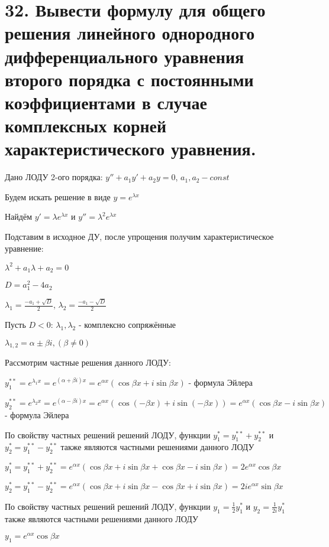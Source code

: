 \documentclass[11pt]{article}
\begin{document}
\section*{32. Вывести формулу для общего решения линейного однородного дифференциального уравнения второго порядка с постоянными коэффициентами в случае комплексных корней характеристического уравнения.}
\par Дано ЛОДУ 2-ого порядка: $y'' + a_{1}y' + a_{2}y = 0$, $a_{1}, a_{2} - const$
\par Будем искать решение в виде $y = e^{\lambda x}$
\par Найдём $y' = \lambda e^{\lambda x}$ и $y'' = \lambda^2 e^{\lambda x}$
\par Подставим в исходное ДУ, после упрощения получим характеристическое уравнение:
\par $\lambda^2 + a_{1} \lambda + a_{2} = 0$
\par $D = a_{1}^2 - 4a_{2}$
\par $\lambda_{1} = \frac{-a_{1} + \sqrt{ D }}{2}$, $\lambda_{2} = \frac{-a_{1} - \sqrt{ D }}{2}$
\par Пусть $D < 0$: $\lambda_{1}, \lambda_{2}$ - комплексно сопряжённые
\par $\lambda_{1, 2} = \alpha \pm \beta i, (\beta \neq 0)$
\par Рассмотрим частные решения данного ЛОДУ:
\par $y_{1}^{**} = e^{\lambda_{1}x} = e^{(\alpha + \beta i)x} = e^{\alpha x}(\cos \beta x + i\sin \beta x)$ - формула Эйлера
\par $y_{2}^{**} = e^{\lambda_{2}x} = e^{(\alpha - \beta i)x} = e^{\alpha x}(\cos (-\beta x) + i\sin (-\beta x)) = e^{\alpha x}(\cos \beta x - i\sin \beta x)$ - формула Эйлера
\par По свойству частных решений решений ЛОДУ, функции $y_{1}^* = y_{1}^{**}+y_{2}^{**}$ и $y_{2}^* = y_{1}^{**}-y_{2}^{**}$ также являются частными решениями данного ЛОДУ
\par $y_{1}^* = y_{1}^{**}+y_{2}^{**} = e^{\alpha x}(\cos \beta x + i\sin \beta x+\cos \beta x - i\sin \beta x)=2e^{\alpha x}\cos \beta x$
\par $y_{2}^* = y_{1}^{**}-y_{2}^{**} = e^{\alpha x}(\cos \beta x + i\sin \beta x-\cos \beta x + i\sin \beta x)=2ie^{\alpha x}\sin \beta x$
\par По свойству частных решений решений ЛОДУ, функции $y_{1} = \frac{1}{2}y_{1}^*$ и $y_{2} = \frac{1}{2i}y_{1}^*$ также являются частными решениями данного ЛОДУ
\par $y_{1} = e^{\alpha x}\cos \beta x$
\end{document}
